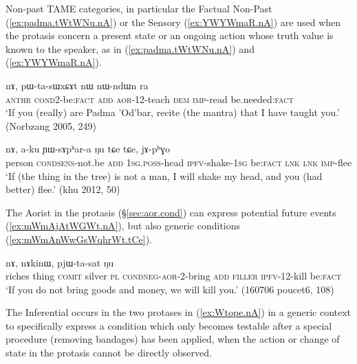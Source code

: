 Non-past TAME categories, in particular the Factual Non-Past (\ref{ex:padma.tWtWNu.nA}) or the Sensory (\ref{ex:YWYWmaR.nA}) are used when the protasis concern a present state or an ongoing action whose truth value is known to the speaker, as in (\ref{ex:padma.tWtWNu.nA}) and (\ref{ex:YWYWmaR.nA}).

\begin{exe}
\ex \label{ex:padma.tWtWNu.nA}
  nɤ, pɯ-ta-sɯxɕɤt nɯ nɯ-ndɯn ra \\
  \textsc{anthr} \textsc{cond}\redp{}2-be:\textsc{fact} \textsc{add} \textsc{aor}-1\fl{}2-teach \textsc{dem} \textsc{imp}-read be.needed:\textsc{fact} \\
 \glt `If you (really) are Padma 'Od'bar, recite (the mantra) that I have taught you.' (Norbzang 2005, 249)
\end{exe}

\begin{exe}
\ex \label{ex:YWYWmaR.nA}
  nɤ, a-ku ɲɯ-sɤpʰar-a ŋu tɕe tɕe, jɤ-pʰɣo \\
 person \textsc{cond}\redp{}\textsc{sens}-not.be \textsc{add} \textsc{1sg}.\textsc{poss}-head \textsc{ipfv}-shake-\textsc{1sg} be:\textsc{fact} \textsc{lnk} \textsc{lnk} \textsc{imp}-flee \\
\glt `If (the thing in the tree) is not a man, I will shake my head, and you (had better) flee.' (khu 2012, 50)
\end{exe}

The Aorist in the protasis (§\ref{sec:aor.cond}) can express potential future events  (\ref{ex:mWmAjAtWGWt.nA}), but also generic conditions (\ref{ex:mWmAnWwGsWqhrWt.tCe}).

\begin{exe}
\ex \label{ex:mWmAjAtWGWt.nA}
  nɤ, nɤkinɯ, pjɯ-ta-sat ŋu \\
 riches thing \textsc{comit} silver \textsc{pl} \textsc{cond}\redp{}\textsc{neg}-\textsc{aor}-2-bring \textsc{add} \textsc{filler} \textsc{ipfv}-1\fl{}2-kill be:\textsc{fact} \\
 \glt `If you do not bring goods and money, we will kill you.' (160706 poucet6, 108)
 \end{exe}

The Inferential occurs in the two protases in (\ref{ex:Wtope.nA}) in a generic context to specifically express a condition which only becomes testable after a special procedure (removing bandages) has been applied, when the action or change of state in the protasis cannot be directly observed.

